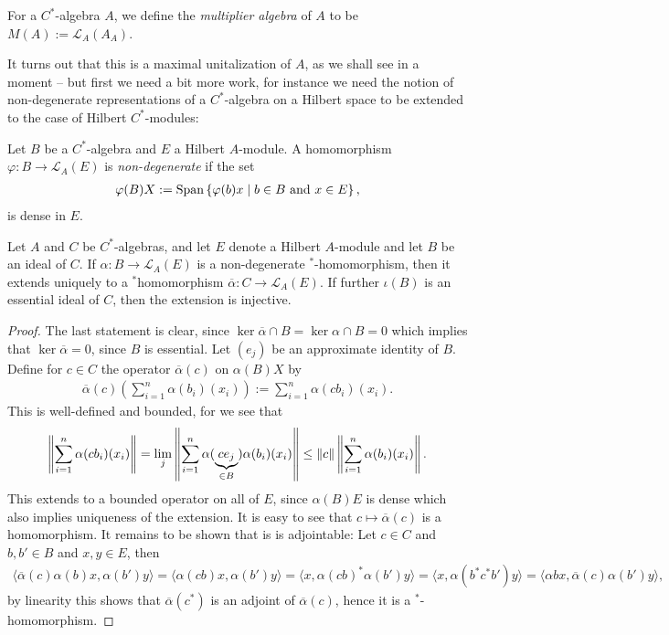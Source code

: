 \begin{definition}
	For a $C^*$-algebra $A$, we define the \emph{multiplier algebra} of $A$ to be $M(A):=\mathcal{L}_A(A_A)$.
\end{definition}
It turns out that this is a maximal unitalization of $A$, as we shall see in a moment -- but first we need a bit more work, for instance we need the notion of non-degenerate representations of a $C^*$-algebra on a Hilbert space to be extended to the case of Hilbert $C^*$-modules:
\begin{definition}
	Let $B$ be a $C^*$-algebra and $E$ a Hilbert $A$-module. A homomorphism $\varphi \colon B \to \mathcal{L}_A(E)$ is \emph{non-degenerate} if the set
	\begin{align*}
		\varphi(B)X:= \mathrm{Span}\left\{ \varphi(b)x \mid b \in B  \text{ and } x \in E \right\},
	\end{align*}
	is dense in $E$. 
\end{definition}
\begin{proposition}
	Let $A$ and $C$ be $C^*$-algebras, and let $E$ denote a Hilbert $A$-module and let $B$ be an ideal of $C$. If $\alpha \colon B \to \mathcal{L}_A(E)$ is a non-degenerate  $^*$-homomorphism, then it extends uniquely to a $^*$homomorphism $\overline \alpha \colon C \to \mathcal{L}_A(E)$. If further $\iota(B)$ is an essential ideal of $C$, then the extension is injective. 
\end{proposition}
\begin{proof}
	The last statement is clear, since $\ker \overline \alpha \cap B = \ker \alpha \cap B = 0$ which implies that $\ker \overline \alpha = 0$, since $B$ is essential. Let $(e_j)$ be an approximate identity of $B$. Define for $c \in C$ the operator $\overline \alpha(c)$ on $\alpha(B)X$ by
	\begin{align*}
		\overline \alpha(c) \left( \sum_{i=1}^n \alpha(b_i)(x_i) \right):= \sum_{i=1}^n \alpha(c b_i) (x_i).
	\end{align*}
	This is well-defined and bounded, for we see that
	\begin{align*}
		\left\lVert \sum_{i=1}^n \alpha(c b_i) (x_i) \right\rVert = \lim_{j} \left\lVert \sum_{i=1}^n \alpha(\underbrace{c e_j}_{\in B})\alpha(b_i) (x_i) \right\rVert \leq \left\lVert c \right\rVert \left\lVert \sum_{i=1}^n \alpha(b_i) (x_i)\right\rVert.
	\end{align*}
	This extends to a bounded operator on all of $E$, since $\alpha(B)E$ is dense which also implies uniqueness of the extension. It is easy to see that $c \mapsto \overline \alpha(c)$ is a homomorphism. It remains to be shown that is is adjointable: Let $c \in C$ and $b,b' \in B$ and $x,y \in E$, then
	\begin{align*}
		\langle \overline \alpha(c) \alpha(b)x,\alpha(b')y \rangle = \langle \alpha(cb) x, \alpha(b')y \rangle = \langle x , \alpha(cb)^*\alpha(b') y\rangle =  \langle x , \alpha(b^*c^*b') y\rangle =  \langle \alpha b x, \overline \alpha(c) \alpha(b') y\rangle,
	\end{align*}
	by linearity this shows that $\overline \alpha(c^*)$ is an adjoint of $\overline \alpha (c)$, hence it is a $^*$-homomorphism.
\end{proof}





